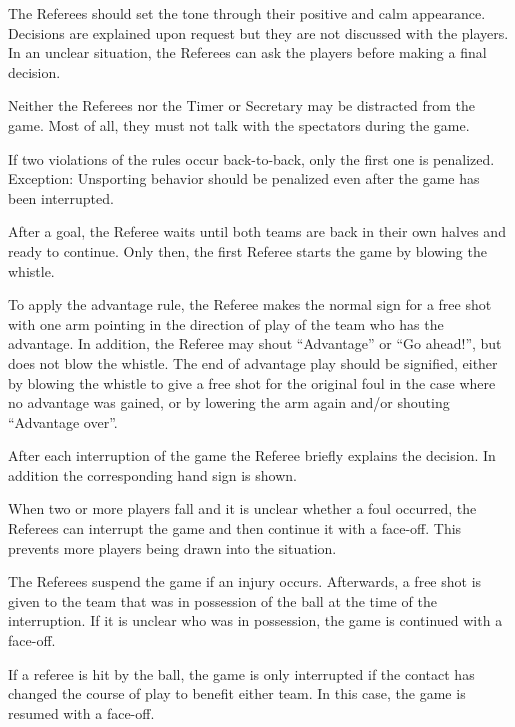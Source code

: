 The Referees should set the tone through their positive and calm appearance.
Decisions are explained upon request but they are not discussed with the players.
In an unclear situation, the Referees can ask the players before making a final decision.

Neither the Referees nor the Timer or Secretary may be distracted from the game.
Most of all, they must not talk with the spectators during the game.

If two violations of the rules occur back-to-back, only the first one is penalized.
Exception: Unsporting behavior should be penalized even after the game has been interrupted.

After a goal, the Referee waits until both teams are back in their own halves and ready to continue.
Only then, the first Referee starts the game by blowing the whistle.

To apply the advantage rule, the Referee makes the normal sign for a free shot with one arm pointing in the direction of play of the team who has the advantage.
In addition, the Referee may shout ``Advantage'' or ``Go ahead!'', but does not blow the whistle.
The end of advantage play should be signified, either by blowing the whistle to give a free shot for the original foul in the case where no advantage was gained, or by lowering the arm again and/or shouting ``Advantage over''.

After each interruption of the game the Referee briefly explains the decision.
In addition the corresponding hand sign is shown.

When two or more players fall and it is unclear whether a foul occurred, the Referees can interrupt the game and then continue it with a face-off.
This prevents more players being drawn into the situation.

The Referees suspend the game if an injury occurs.
Afterwards, a free shot is given to the team that was in possession of the ball at the time of the interruption.
If it is unclear who was in possession, the game is continued with a face-off.

If a referee is hit by the ball, the game is only interrupted if the contact has changed the course of play to benefit either team.
In this case, the game is resumed with a face-off.

